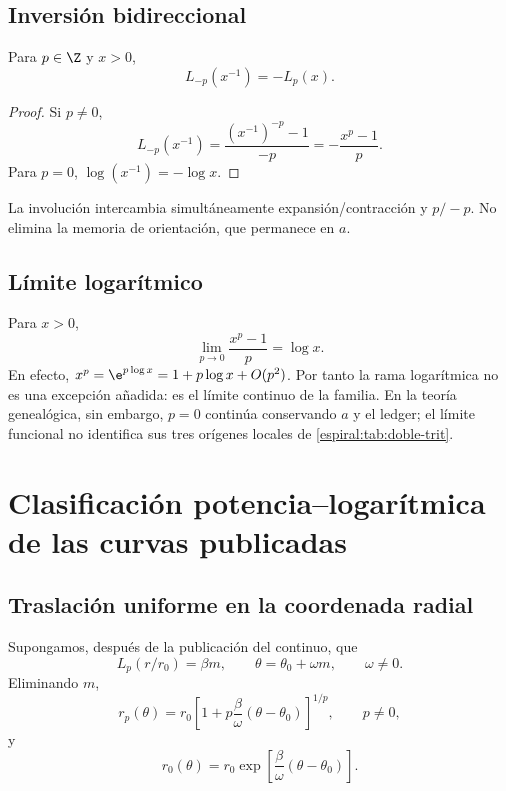 \section{Inversión bidireccional}

\begin{proposition}
Para \(p\in\Z\) y \(x>0\),
\begin{equation}
 L_{-p}(x^{-1})=-L_p(x).
 \label{espiral:eq:lp-inversion}
\end{equation}
\end{proposition}
\begin{proof}
Si \(p\neq0\),
\[
 L_{-p}(x^{-1})
 =\frac{(x^{-1})^{-p}-1}{-p}
 =-\frac{x^p-1}{p}.
\]
Para \(p=0\), \(\log(x^{-1})=-\log x\).
\end{proof}

La involución intercambia simultáneamente expansión/contracción y
\(p/-p\). No elimina la memoria de orientación, que permanece en
\(a\).

\section{Límite logarítmico}

Para \(x>0\),
\[
 \lim_{p\to0}\frac{x^p-1}{p}=\log x.
\]
En efecto, \(x^p=\e^{p\log x}=1+p\log x+O(p^2)\). Por tanto la rama
logarítmica no es una excepción añadida: es el límite continuo de la familia.
En la teoría genealógica, sin embargo, \(p=0\) continúa conservando
\(a\) y el ledger; el límite funcional no identifica sus tres
orígenes locales de \cref{espiral:tab:doble-trit}.

\chapter{Clasificación potencia--logarítmica de las curvas publicadas}

\section{Traslación uniforme en la coordenada radial}

Supongamos, después de la publicación del continuo, que
\[
 L_p(r/r_0)=\beta m,
 \qquad
 \theta=\theta_0+\omega m,
 \qquad \omega\neq0.
\]
Eliminando \(m\),
\begin{equation}
 r_p(\theta)=r_0
 \left[1+p\frac{\beta}{\omega}
 (\theta-\theta_0)\right]^{1/p},
 \qquad p\neq0,
 \label{espiral:eq:familia-potencia}
\end{equation}
y
\begin{equation}
 r_0(\theta)=r_0
 \exp\!\left[\frac{\beta}{\omega}
 (\theta-\theta_0)\right].
 \label{espiral:eq:familia-log}
\end{equation}

